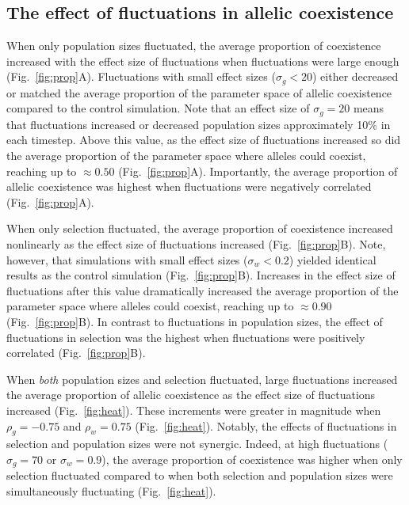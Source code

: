 \documentclass[12pt]{article}
\begin{document}
\subsection*{The effect of fluctuations in allelic coexistence}

When only population sizes fluctuated, the average proportion of coexistence increased with the effect size of fluctuations when fluctuations were large enough (Fig.~\ref{fig:prop}A). Fluctuations with small effect sizes  ($\sigma_{g} < 20$) either decreased or matched the average proportion of the parameter space of allelic coexistence compared to the control simulation. Note that an effect size of $\sigma_{g}= 20$ means that fluctuations increased or decreased population sizes approximately 10\% in each timestep. Above this value, as the effect size of fluctuations increased so did the average proportion of the parameter space where alleles could coexist, reaching up to $\approx 0.50$ (Fig.~\ref{fig:prop}A). Importantly, the average proportion of allelic coexistence was highest when fluctuations were negatively correlated (Fig.~\ref{fig:prop}A).


When only selection fluctuated, the average proportion of coexistence increased nonlinearly as the effect size of fluctuations increased (Fig.~\ref{fig:prop}B). Note, however, that simulations with small effect sizes ($\sigma_{w} < 0.2$) yielded identical results as the control simulation (Fig.~\ref{fig:prop}B). Increases in the effect size of fluctuations after this value dramatically increased the average proportion of the parameter space where alleles could coexist, reaching up to $\approx 0.90$ (Fig.~\ref{fig:prop}B). In contrast to fluctuations in population sizes, the effect of fluctuations in selection was the highest when fluctuations were positively correlated (Fig.~\ref{fig:prop}B).

When \textit{both} population sizes and selection fluctuated,  large fluctuations  increased the average proportion of allelic coexistence  as the effect size of fluctuations increased (Fig.~\ref{fig:heat}). These increments were greater in magnitude when $\rho_{g}= -0.75$ and $\rho_{w}= 0.75$ (Fig.~\ref{fig:heat}). Notably, the effects of fluctuations in selection and population sizes were not synergic. Indeed, at high fluctuations ($\sigma_{g} = 70$ or $\sigma_{w} = 0.9$), the average proportion of coexistence was higher when only selection fluctuated compared to when both selection and population sizes were simultaneously fluctuating (Fig.~\ref{fig:heat}).
\end{document}
